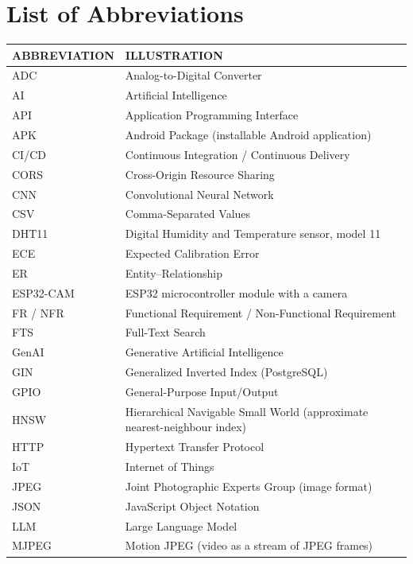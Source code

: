 \clearpage
\chapter*{List of Abbreviations}
\begin{singlespace}
\setlength{\parskip}{0pt}
\small
\begin{longtable}{|P{3.2cm}|P{10.2cm}|}
\hline
\textbf{ABBREVIATION} & \textbf{ILLUSTRATION}\\\hline\endhead
ADC & Analog-to-Digital Converter\\\hline
AI & Artificial Intelligence\\\hline
API & Application Programming Interface\\\hline
APK & Android Package (installable Android application)\\\hline
CI/CD & Continuous Integration / Continuous Delivery\\\hline
CORS & Cross-Origin Resource Sharing\\\hline
CNN & Convolutional Neural Network\\\hline
CSV & Comma-Separated Values\\\hline
DHT11 & Digital Humidity and Temperature sensor, model 11\\\hline
ECE & Expected Calibration Error\\\hline
ER & Entity--Relationship\\\hline
ESP32-CAM & ESP32 microcontroller module with a camera\\\hline
FR / NFR & Functional Requirement / Non-Functional Requirement\\\hline
FTS & Full-Text Search\\\hline
GenAI & Generative Artificial Intelligence\\\hline
GIN & Generalized Inverted Index (PostgreSQL)\\\hline
GPIO & General-Purpose Input/Output\\\hline
HNSW & Hierarchical Navigable Small World (approximate nearest-neighbour index)\\\hline
HTTP & Hypertext Transfer Protocol\\\hline
IoT & Internet of Things\\\hline
JPEG & Joint Photographic Experts Group (image format)\\\hline
JSON & JavaScript Object Notation\\\hline
LLM & Large Language Model\\\hline
MJPEG & Motion JPEG (video as a stream of JPEG frames)\\\hline

\end{longtable}
\end{singlespace}
